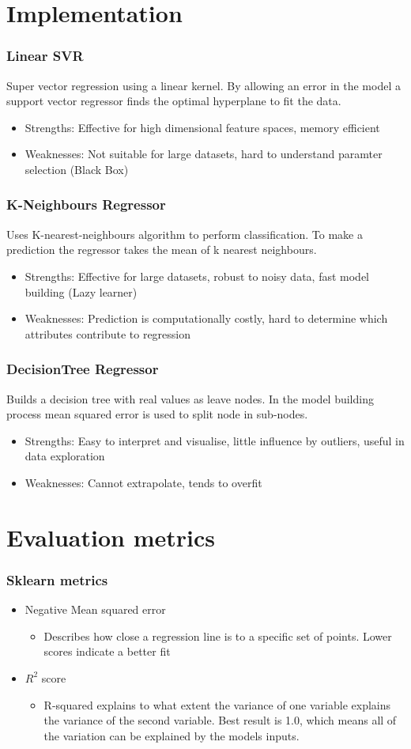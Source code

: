 \documentclass{beamer}
\begin{document}
\section{Implementation}
\frame
{
  \frametitle{Linear SVR}
  Super vector regression using a linear kernel. By allowing an error in the model a
  support vector regressor finds the optimal hyperplane to fit the data.

  \begin{itemize}
    \item Strengths: Effective for high dimensional feature spaces, memory efficient
    \item Weaknesses: Not suitable for large datasets, hard to understand paramter selection (Black Box)
  \end{itemize}
}

\frame
{
  \frametitle{K-Neighbours Regressor}
  Uses K-nearest-neighbours algorithm to perform classification. To make a prediction the regressor takes the mean of k nearest neighbours.
  \begin{itemize}
    \item Strengths: Effective for large datasets, robust to noisy data, fast model building (Lazy learner)
    \item Weaknesses: Prediction is computationally costly, hard to determine which attributes contribute to regression
  \end{itemize}}

\frame
{
  \frametitle{DecisionTree Regressor}
  Builds a decision tree with real values as leave nodes. In the model building process mean squared error is used to split node in sub-nodes.
  \begin{itemize}
    \item Strengths: Easy to interpret and visualise, little influence by outliers, useful in data exploration
    \item Weaknesses: Cannot extrapolate, tends to overfit
  \end{itemize}}

\section{Evaluation metrics}
\frame
{
  \frametitle{Sklearn metrics}

  \begin{itemize}
  \item Negative Mean squared error
    \begin{itemize}
      \item Describes how close a regression line is to a specific set of points. Lower scores indicate a better fit
    \end{itemize}
  \item $R^{2}$ score
    \begin{itemize}
      \item R-squared explains to what extent the variance of one variable explains the variance of the second variable. Best result is 1.0, which means all of the variation can be explained by the models inputs.
    \end{itemize}
  \end{itemize}
}
\end{document}
